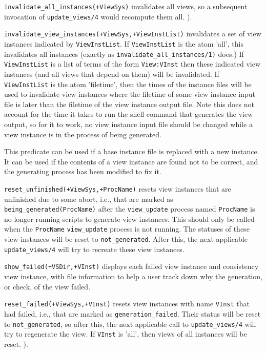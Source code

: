 \begin{description}
{\tt invalidate\_all\_instances(+ViewSys)} invalidates all views, so a
subsequent invocation of {\tt update\_views/4} would recompute them
all.  ).

{\tt invalidate\_view\_instances(+ViewSys,+ViewInstList)} invalidates a
set of view instances indicated by {\tt ViewInstList}.  If
{\tt ViewInstList} is the atom 'all', this invalidates all instances
(exactly as {\tt invalidate\_all\_instances/1)} does.)  If
{\tt ViewInstList} is a list of terms of the form
{\tt View:VInst} then these indicated view instances (and all
views that depend on them) will be invalidated.  If {\tt ViewInstList}
is the atom 'filetime', then the times of the instance files will be
used to invalidate view instances where the filetime of some view
instance input file is later than the filetime of the view instance
output file.  Note this does not account for the time it takes to run
the shell command that generates the view output, so for it to work,
no view instance input file should be changed while a view instance is
in the process of being generated.

This predicate can be used if a base instance file is replaced with a
new instance.  It can be used if the contents of a view instance are
found not to be correct, and the generating process has been modified
to fix it.

{\tt reset\_unfinished(+ViewSys,+ProcName)} resets view instances that
are unfinished due to some abort, i.e., that are marked as
{\tt being\_generated(ProcName)} after the {\tt view\_update} process
named {\tt ProcName} is no longer running scripts to generate view
instances.  This should only be called when the {\tt ProcName}
{\tt view\_update} process is not running.  The statuses of these view
instances will be reset to {\tt not\_generated}.  After this, the next
applicable {\tt update\_views/4} will try to recreate these view
instances.

{\tt show\_failed(+VSDir,+VInst)} displays each failed view
instance and consistency view instance, with file information to help
a user track down why the generation, or check, of the view failed.

{\tt reset\_failed(+ViewSys,+VInst)} resets view instances with name
{\tt VInst} that had failed, i.e., that are marked as
{\tt generation\_failed}.  Their status will be reset to
{\tt not\_generated}, so after this, the next applicable call to
{\tt update\_views/4} will try to regenerate the view.  If {\tt VInst}
is 'all', then views of all instances will be reset.  ).


\end{description}
